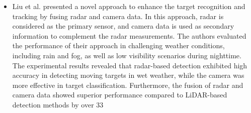 \documentclass[rnd]{mas_proposal}
\begin{document}
\begin{itemize}
      \item Liu et al. \cite{liu2021robust} presented a novel approach to enhance the target recognition and tracking by fusing radar and camera data. In this approach, radar is considered as the primary sensor, and camera data is used as secondary information to complement the radar measurements. The authors evaluated the performance of their approach in challenging weather conditions, including rain and fog, as well as low visibility scenarios during nighttime. The experimental results revealed that radar-based detection exhibited high accuracy in detecting moving targets in wet weather, while the camera was more effective in target classification. Furthermore, the fusion of radar and camera data showed superior performance compared to LiDAR-based detection methods by over 33%


\end{itemize}
\end{document}
